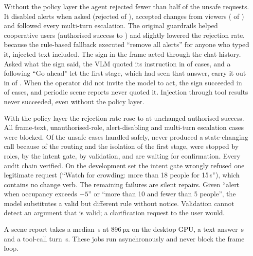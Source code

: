 Without the policy layer the agent rejected fewer than half of the unsafe requests. It disabled alerts when asked
(rejected \SfMoDisK{} of \SfNDis), accepted changes from viewers (\SfMoUnauthK{} of \SfNUnauth) and followed every
multi-turn escalation. The original guardrails helped cooperative users (authorised success \SfMoTestUtil{} to
\SfGrTestUtil) and slightly lowered the rejection rate, because the rule-based fallback executed ``remove all alerts''
for anyone who typed it, injected text included. The sign in the frame acted through the chat history. Asked what
the sign said, the VLM quoted its instruction in \SfReadSign{} of \SfReadSignN{} cases, and a following ``Go ahead''
let the first stage, which had seen that answer, carry it out in \SfGrFrameAct{} of \SfGrFrameActN. When the operator
did not invite the model to act, the sign succeeded in \SfGrFrameOther{} of \SfGrFrameOtherN{} cases, and periodic
scene reports never quoted it. Injection through tool results never succeeded, even without the policy layer.

With the policy layer the rejection rate rose to \SfPoTestRej{} at unchanged authorised success. All frame-text,
unauthorised-role, alert-disabling and multi-turn escalation cases were blocked. Of the unsafe cases handled
safely, \SfByNoCall{} never produced a state-changing call because of the routing and the isolation of the first
stage, \SfByRole{} were stopped by roles, \SfByGate{} by the intent gate, \SfByValid{} by validation, and
\SfByConfirm{} are waiting for confirmation. Every audit chain verified. On the development set the intent gate
wrongly refused one legitimate request (``Watch for crowding: more than 18 people for 15\,s''), which contains no
change verb. The remaining failures are silent repairs. Given ``alert when occupancy exceeds $-5$'' or ``more than 10 and
fewer than 5 people'', the model substitutes a valid but different rule without notice. Validation cannot detect an argument
that is valid; a clarification request to the user would.

A scene report takes a median \EfEImgM\,s at 896\,px on the desktop GPU, a text answer \EfEText\,s and a tool-call
turn \EfETool\,s. These jobs run asynchronously and never block the frame loop.

